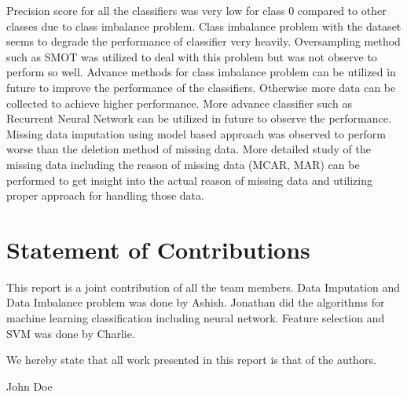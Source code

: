 \documentclass[conference]{IEEEtran}
\begin{document}
Precision score for all the classifiers was very low for class 0 compared to other classes due to class imbalance problem. Class imbalance problem with the dataset seems to degrade the performance of classifier very heavily. Oversampling method such as SMOT was utilized to deal with this problem but was not observe to perform so well. Advance methods for class imbalance problem can be utilized in future to improve the performance of the classifiers. Otherwise more data can be collected to achieve higher performance. More advance classifier such as Recurrent Neural Network can be utilized in future to observe the performance. Missing data imputation using model based approach was observed to perform worse than the deletion method of missing data. More detailed study of the missing data including the reason of missing data (MCAR, MAR) can be performed to get insight into the actual reason of missing data and utilizing proper approach for handling those data.

\appendices
\section{Statement of Contributions}
This report is a joint contribution of all the team members. Data Imputation and Data Imbalance problem was done by Ashish. Jonathan did the algorithms for machine learning classification including neural network. Feature selection and SVM was done by Charlie.

We hereby state that all work presented in this report is that of the authors.

\printbibliography

\begin{IEEEbiography}{John Doe}
\blindtext
\end{IEEEbiography}
\end{document}
